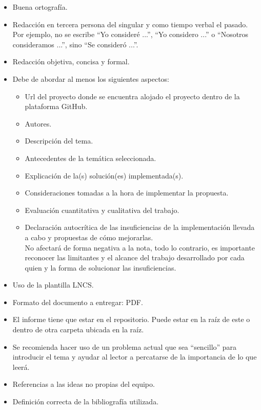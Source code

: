 \documentclass[10pt]{article}
\begin{document}
		\begin{itemize}
			
			\item Buena ortografía.
			
			\item Redacción en tercera persona del singular y como tiempo verbal el pasado. Por ejemplo, no se escribe ``Yo consideré ...'', ``Yo considero ...'' o ``Nosotros consideramos ...'', sino ``Se consideró ...''. 
			
			\item Redacción objetiva, concisa y formal.
			
			\item Debe de abordar al menos los siguientes aspectos:
			\begin{itemize}
				\item Url del proyecto donde se encuentra alojado el proyecto dentro de la plataforma GitHub.
				\item Autores.
				\item Descripción del tema.
				\item Antecedentes de la temática seleccionada.
				\item Explicación de la(s) solución(es) implementada(s). 
				\item Consideraciones tomadas a la hora de implementar la propuesta.
				\item Evaluación cuantitativa y cualitativa del trabajo.
				\item Declaración autocrítica de las insuficiencias de la implementación llevada a cabo y propuestas de cómo mejorarlas. \\No afectará de forma negativa a la nota, todo lo contrario, es importante reconocer las limitantes y el alcance del trabajo desarrollado por cada quien y la forma de solucionar las insuficiencias.
			\end{itemize}
			
			\item Uso de la plantilla LNCS.
			
			\item Formato del documento a entregar: PDF.
			
			\item El informe tiene que estar en el repositorio. Puede estar en la raíz de este o dentro de otra carpeta ubicada en la raíz.
			
			\item Se recomienda hacer uso de un problema actual que sea ``sencillo'' para introducir el tema y ayudar al lector a percatarse de la importancia de lo que leerá.
			
			\item Referencias a las ideas no propias del equipo.
			
			\item Definición correcta de la bibliografía utilizada. 
			
		\end{itemize}
		
\end{document}
